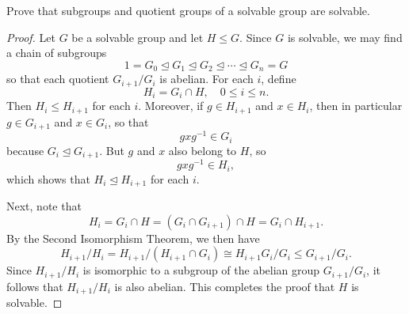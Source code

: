  Prove that subgroups and quotient groups of a solvable
group are solvable.
\begin{proof}
  Let $G$ be a solvable group and let $H\leq G$. Since $G$ is
  solvable, we may find a chain of subgroups
  \begin{equation*}
    1 = G_0 \trianglelefteq G_1
    \trianglelefteq G_2
    \trianglelefteq\cdots
    \trianglelefteq G_n = G
  \end{equation*}
  so that each quotient $G_{i+1}/G_i$ is abelian. For each $i$, define
  \begin{equation*}
    H_i = G_i\cap H, \quad 0\leq i\leq n.
  \end{equation*}
  Then $H_i\leq H_{i+1}$ for each $i$. Moreover, if $g\in H_{i+1}$ and
  $x\in H_i$, then in particular $g\in G_{i+1}$ and $x\in G_i$, so
  that
  \begin{equation*}
    gxg^{-1}\in G_i
  \end{equation*}
  because $G_i\trianglelefteq G_{i+1}$. But $g$ and $x$ also belong to
  $H$, so
  \begin{equation*}
    gxg^{-1}\in H_i,
  \end{equation*}
  which shows that $H_i\trianglelefteq H_{i+1}$ for each $i$.

  Next, note that
  \begin{equation*}
    H_i = G_i\cap H = (G_i\cap G_{i+1})\cap H
    = G_i\cap H_{i+1}.
  \end{equation*}
  By the Second Isomorphism Theorem, we then have
  \begin{equation*}
    H_{i+1}/H_i = H_{i+1}/(H_{i+1}\cap G_i)
    \cong H_{i+1}G_i/G_i \leq G_{i+1}/G_i.
  \end{equation*}
  Since $H_{i+1}/H_i$ is isomorphic to a subgroup of the abelian group
  $G_{i+1}/G_i$, it follows that $H_{i+1}/H_i$ is also abelian. This
  completes the proof that $H$ is solvable.


\end{proof}
